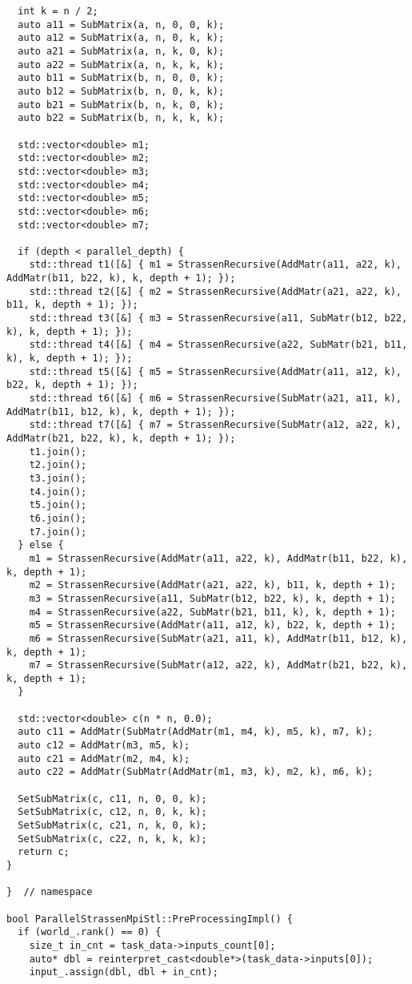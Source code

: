 \documentclass[12pt]{article}
\begin{document}
\begin{lstlisting}
  int k = n / 2;
  auto a11 = SubMatrix(a, n, 0, 0, k);
  auto a12 = SubMatrix(a, n, 0, k, k);
  auto a21 = SubMatrix(a, n, k, 0, k);
  auto a22 = SubMatrix(a, n, k, k, k);
  auto b11 = SubMatrix(b, n, 0, 0, k);
  auto b12 = SubMatrix(b, n, 0, k, k);
  auto b21 = SubMatrix(b, n, k, 0, k);
  auto b22 = SubMatrix(b, n, k, k, k);

  std::vector<double> m1;
  std::vector<double> m2;
  std::vector<double> m3;
  std::vector<double> m4;
  std::vector<double> m5;
  std::vector<double> m6;
  std::vector<double> m7;

  if (depth < parallel_depth) {
    std::thread t1([&] { m1 = StrassenRecursive(AddMatr(a11, a22, k), AddMatr(b11, b22, k), k, depth + 1); });
    std::thread t2([&] { m2 = StrassenRecursive(AddMatr(a21, a22, k), b11, k, depth + 1); });
    std::thread t3([&] { m3 = StrassenRecursive(a11, SubMatr(b12, b22, k), k, depth + 1); });
    std::thread t4([&] { m4 = StrassenRecursive(a22, SubMatr(b21, b11, k), k, depth + 1); });
    std::thread t5([&] { m5 = StrassenRecursive(AddMatr(a11, a12, k), b22, k, depth + 1); });
    std::thread t6([&] { m6 = StrassenRecursive(SubMatr(a21, a11, k), AddMatr(b11, b12, k), k, depth + 1); });
    std::thread t7([&] { m7 = StrassenRecursive(SubMatr(a12, a22, k), AddMatr(b21, b22, k), k, depth + 1); });
    t1.join();
    t2.join();
    t3.join();
    t4.join();
    t5.join();
    t6.join();
    t7.join();
  } else {
    m1 = StrassenRecursive(AddMatr(a11, a22, k), AddMatr(b11, b22, k), k, depth + 1);
    m2 = StrassenRecursive(AddMatr(a21, a22, k), b11, k, depth + 1);
    m3 = StrassenRecursive(a11, SubMatr(b12, b22, k), k, depth + 1);
    m4 = StrassenRecursive(a22, SubMatr(b21, b11, k), k, depth + 1);
    m5 = StrassenRecursive(AddMatr(a11, a12, k), b22, k, depth + 1);
    m6 = StrassenRecursive(SubMatr(a21, a11, k), AddMatr(b11, b12, k), k, depth + 1);
    m7 = StrassenRecursive(SubMatr(a12, a22, k), AddMatr(b21, b22, k), k, depth + 1);
  }

  std::vector<double> c(n * n, 0.0);
  auto c11 = AddMatr(SubMatr(AddMatr(m1, m4, k), m5, k), m7, k);
  auto c12 = AddMatr(m3, m5, k);
  auto c21 = AddMatr(m2, m4, k);
  auto c22 = AddMatr(SubMatr(AddMatr(m1, m3, k), m2, k), m6, k);

  SetSubMatrix(c, c11, n, 0, 0, k);
  SetSubMatrix(c, c12, n, 0, k, k);
  SetSubMatrix(c, c21, n, k, 0, k);
  SetSubMatrix(c, c22, n, k, k, k);
  return c;
}

}  // namespace

bool ParallelStrassenMpiStl::PreProcessingImpl() {
  if (world_.rank() == 0) {
    size_t in_cnt = task_data->inputs_count[0];
    auto* dbl = reinterpret_cast<double*>(task_data->inputs[0]);
    input_.assign(dbl, dbl + in_cnt);


\end{lstlisting}
\end{document}
